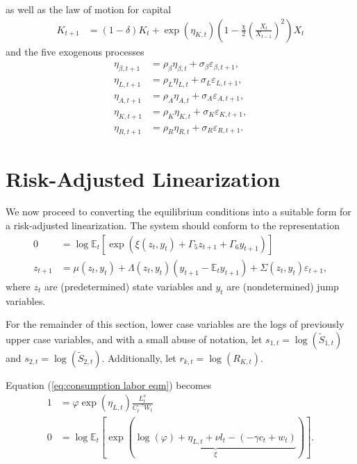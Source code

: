 \documentclass[12 pt, oneside]{article}
\theoremstyle{definition}
\theoremstyle{definition}
\theoremstyle{definition}
\newcommand{\E}{\mathbb{E}}
\newcommand{\fd}{\vspace{2.5mm}}
\begin{document}
as well as the law of motion for capital
\begin{align}\label{eq:law of motion capital eqm}
  K_{t + 1} & = (1 - \delta)K_t + \exp(\eta_{K, t})\left(1 - \frac{\chi}{2}\left(\frac{X_t}{X_{t - 1}}\right)^2\right)X_t
\end{align}
and the five exogenous processes
\begin{align}
  \eta_{\beta, t + 1} & = \rho_\beta\eta_{\beta, t} + \sigma_\beta \varepsilon_{\beta, t + 1},\\
  \eta_{L, t + 1} & = \rho_L\eta_{L, t} + \sigma_L \varepsilon_{L, t + 1},\\
  \eta_{A, t + 1} & = \rho_A\eta_{A, t} + \sigma_A \varepsilon_{A, t + 1},\\
  \eta_{K, t + 1} & = \rho_K\eta_{K, t} + \sigma_K \varepsilon_{K, t + 1},\\
  \eta_{R, t + 1} & = \rho_R\eta_{R, t} + \sigma_R \varepsilon_{R, t + 1}.
\end{align}

\section{Risk-Adjusted Linearization}\label{sec:ral}

We now proceed to converting the equilibrium conditions into a suitable form for a risk-adjusted linearization. The system should conform to the representation
\begin{align*}
  0 & = \log \E_t\left[\exp\left(\xi(z_t, y_t) + \Gamma_5 z_{t + 1} + \Gamma_6 y_{t + 1}\right)\right]\\
  z_{t + 1} & = \mu(z_t, y_t) + \Lambda(z_t, y_t) (y_{t + 1} - \E_t y_{t + 1}) + \Sigma(z_t, y_t) \varepsilon_{t + 1},
\end{align*}
where $z_t$ are (predetermined) state variables and $y_t$ are (nondetermined) jump variables.

For the remainder of this section, lower case variables are the logs of previously upper case variables, and with a small abuse of notation, let $s_{1, t} = \log(\tilde{S}_{1, t})$ and $s_{2, t} = \log(\tilde{S}_{2, t})$. Additionally, let $r_{k, t} = \log(R_{K, t})$.

\fd

Equation (\ref{eq:consumption labor eqm}) becomes
\begin{align*}
  1 & = \varphi \exp(\eta_{L, t})\frac{L_t^\nu}{C_t^{-\gamma}W_t}\\
  0 & = \log \E_t\left[\exp\left(\underbrace{\log(\varphi) + \eta_{L, t} + \nu l_t - (- \gamma c_t + w_t)}_{\xi}\right)\right].
\end{align*}
\end{document}
